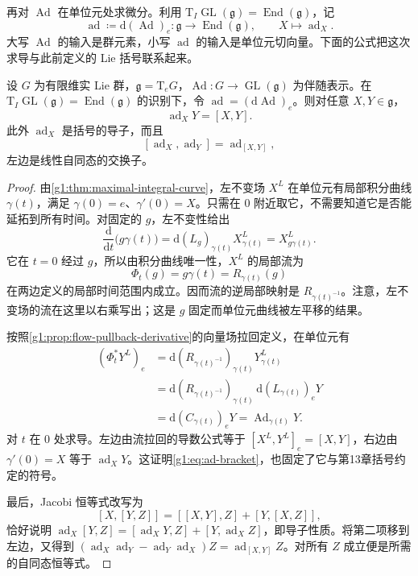 再对 \(\operatorname{Ad}\) 在单位元处求微分。利用 \(\mathrm{T}_I\operatorname{GL}(\mathfrak g)=\operatorname{End}(\mathfrak g)\)，记
\[
	\operatorname{ad}\coloneqq\mathrm{d}(\operatorname{Ad})_e:
	\mathfrak g\longrightarrow\operatorname{End}(\mathfrak g),\qquad
	X\longmapsto\operatorname{ad}_X.
\]
大写 \(\operatorname{Ad}\) 的输入是群元素，小写 \(\operatorname{ad}\) 的输入是单位元切向量。下面的公式把这次求导与此前定义的 Lie 括号联系起来。

\begin{proposition}\label{g1:prop:adjoint-differential-bracket}
	设 \(G\) 为有限维实 Lie 群，\(\mathfrak g=\mathrm{T}_eG\)，\(\operatorname{Ad}:G\to\operatorname{GL}(\mathfrak g)\) 为伴随表示。在 \(\mathrm{T}_I\operatorname{GL}(\mathfrak g)=\operatorname{End}(\mathfrak g)\) 的识别下，令 \(\operatorname{ad}=(\mathrm{d}\operatorname{Ad})_e\)。则对任意 \(X,Y\in\mathfrak g\)，
	\begin{equation}\label{g1:eq:ad-bracket}
		\operatorname{ad}_XY=[X,Y].
	\end{equation}
	此外 \(\operatorname{ad}_X\) 是括号的导子，而且
	\[
		[\operatorname{ad}_X,\operatorname{ad}_Y]=\operatorname{ad}_{[X,Y]},
	\]
	左边是线性自同态的交换子。
\end{proposition}
\begin{proof}
	由\cref{g1:thm:maximal-integral-curve}，左不变场 \(X^L\) 在单位元有局部积分曲线 \(\gamma(t)\)，满足 \(\gamma(0)=e\)、\(\gamma'(0)=X\)。只需在 \(0\) 附近取它，不需要知道它是否能延拓到所有时间。对固定的 \(g\)，左不变性给出
	\[
		\frac{\mathrm{d}}{\mathrm{d}t}\bigl(g\gamma(t)\bigr)
		=\mathrm{d}(L_g)_{\gamma(t)}X^L_{\gamma(t)}
		=X^L_{g\gamma(t)}.
	\]
	它在 \(t=0\) 经过 \(g\)，所以由积分曲线唯一性，\(X^L\) 的局部流为
	\begin{equation}\label{g1:eq:left-invariant-local-flow}
		\Phi_t(g)=g\gamma(t)=R_{\gamma(t)}(g)
	\end{equation}
	在两边定义的局部时间范围内成立。因而流的逆局部映射是 \(R_{\gamma(t)^{-1}}\)。注意，左不变场的流在这里以右乘写出；这是 \(g\) 固定而单位元曲线被左平移的结果。

	按照\cref{g1:prop:flow-pullback-derivative}的向量场拉回定义，在单位元有
	\begin{align*}
		(\Phi_t^*Y^L)_e
		&=\mathrm{d}(R_{\gamma(t)^{-1}})_{\gamma(t)}Y^L_{\gamma(t)}\\
		&=\mathrm{d}(R_{\gamma(t)^{-1}})_{\gamma(t)}\,\mathrm{d}(L_{\gamma(t)})_eY\\
		&=\mathrm{d}(C_{\gamma(t)})_eY
		=\operatorname{Ad}_{\gamma(t)}Y.
	\end{align*}
	对 \(t\) 在 \(0\) 处求导。左边由流拉回的导数公式等于 \([X^L,Y^L]_e=[X,Y]\)，右边由 \(\gamma'(0)=X\) 等于 \(\operatorname{ad}_XY\)。这证明\eqref{g1:eq:ad-bracket}，也固定了它与第13章括号约定的符号。

	最后，Jacobi 恒等式改写为
	\[
		[X,[Y,Z]]=[[X,Y],Z]+[Y,[X,Z]],
	\]
	恰好说明 \(\operatorname{ad}_X[Y,Z]=[\operatorname{ad}_XY,Z]+[Y,\operatorname{ad}_XZ]\)，即导子性质。将第二项移到左边，又得到 \((\operatorname{ad}_X\operatorname{ad}_Y-\operatorname{ad}_Y\operatorname{ad}_X)Z=\operatorname{ad}_{[X,Y]}Z\)。对所有 \(Z\) 成立便是所需的自同态恒等式。
\end{proof}

